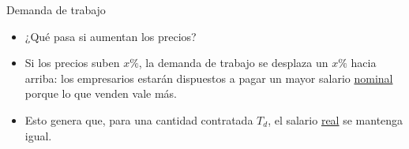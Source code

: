 \documentclass{beamer}
\begin{document}
\begin{frame}{Demanda de trabajo}

    \begin{itemize}
        \item ¿Qué pasa si aumentan los precios? 
        \item Si los precios suben $x\%$, la demanda de trabajo se desplaza un $x\%$ hacia arriba: los empresarios estarán dispuestos a pagar un mayor salario \underline{nominal} porque lo que venden vale más. 
        \item Esto genera que, para una cantidad contratada $T_d$, el salario \underline{real} se mantenga igual.
    \end{itemize}
        \begin{center}
            \begin{figure}[H]
            \begin{center}
            \end{center}
            \end{figure}
        \end{center}
\end{frame}
\end{document}
